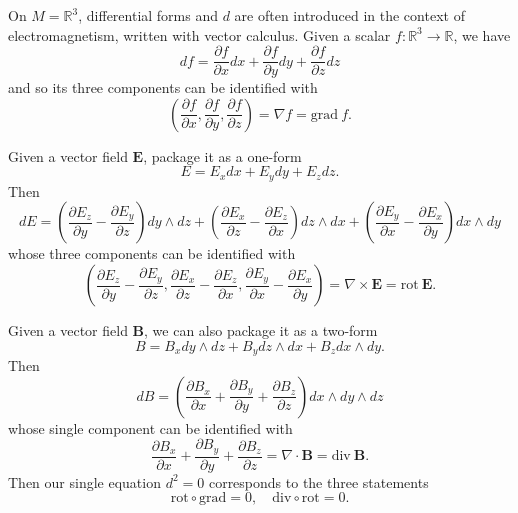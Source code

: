 \documentclass[12pt]{article}
\numberwithin{equation}{section}
\theoremstyle{remark}
\def\bR{\mathbb{R}}
\begin{document}
On $M=\bR^3$, differential forms and $d$ are often introduced in the context of electromagnetism, written with vector calculus.
Given a scalar $f:\bR^3\to \bR$, we have \begin{equation}
df = \frac{\partial f}{\partial x}dx + \frac{\partial f}{\partial y}dy + \frac{\partial f}{\partial z}dz
\end{equation}
and so its three components can be identified with \begin{equation}
(\frac{\partial f}{\partial x},\frac{\partial f}{\partial y},\frac{\partial f}{\partial z}) = \nabla f = \mathrm{grad}\ f.
\end{equation}

Given a vector field $\mathbf{E}$, package it as a one-form \begin{equation}
E= E_x dx + E_y dy + E_z dz.
\end{equation}
Then \begin{equation}
dE = \left(\frac{\partial E_z}{\partial y} - \frac{\partial E_y}{\partial z}\right) dy\wedge dz
+ \left(\frac{\partial E_x}{\partial z} - \frac{\partial E_z}{\partial x}\right) dz\wedge dx
+ \left(\frac{\partial E_y}{\partial x} - \frac{\partial E_x}{\partial y}\right) dx\wedge dy
\end{equation}
whose three components can be identified with \begin{equation}
\left(\frac{\partial E_z}{\partial y} - \frac{\partial E_y}{\partial z},\frac{\partial E_x}{\partial z} - \frac{\partial E_z}{\partial x},\frac{\partial E_y}{\partial x} - \frac{\partial E_x}{\partial y}\right) = \nabla\times \mathbf{E} = \mathrm{rot}\ \mathbf{E}.
\end{equation}

Given a vector field $\mathbf{B}$, we can also package it as a two-form \begin{equation}
B = B_x dy\wedge dz + B_y dz\wedge dx + B_z dx\wedge dy.
\end{equation}
Then \begin{equation}
  dB=(\frac{\partial B_x}{\partial x} + \frac{\partial B_y}{\partial y} + \frac{\partial B_z}{\partial z}) dx\wedge dy\wedge dz
\end{equation}
whose single component can be identified with \begin{equation}
\frac{\partial B_x}{\partial x} + \frac{\partial B_y}{\partial y} + \frac{\partial B_z}{\partial z} = \nabla\cdot \mathbf{B} = \mathrm{div}\ \mathbf{B}.
\end{equation}
Then our single equation $d^2=0$ corresponds to the three statements \begin{equation}
  \mathrm{rot} \circ \mathrm{grad} = 0,\quad
  \mathrm{div} \circ \mathrm{rot} = 0.
\end{equation}
\end{document}
